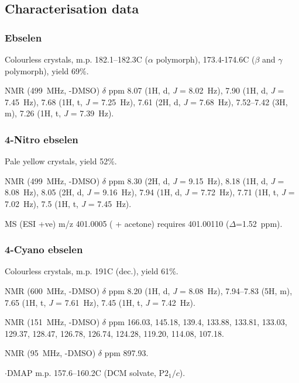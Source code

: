 \begin{refsection}
\subsection{Characterisation data}

\subsubsection{Ebselen }
Colourless crystals, m.p. 182.1--182.3\degree{}C ($\alpha$ polymorph), 173.4-174.6\degree{}C ($\beta$ and $\gamma$ polymorph), yield 69\%.

 NMR (499~MHz, -DMSO) $ \delta $ ppm 8.07 (1H, d, \textit{J} = 8.02~Hz), 7.90 (1H, d, \textit{J} = 7.45~Hz), 7.68 (1H, t, \textit{J} = 7.25~Hz), 7.61 (2H, d, \textit{J} = 7.68~Hz), 7.52--7.42 (3H, m), 7.26 (1H, t, \textit{J} = 7.39~Hz).

\subsubsection{4-Nitro ebselen }
Pale yellow crystals, yield 52\%.

 NMR (499~MHz, -DMSO) $ \delta $ ppm 8.30 (2H, d, \textit{J} = 9.15~Hz), 8.18 (1H, d, \textit{J} = 8.08~Hz), 8.05 (2H, d, \textit{J} = 9.16~Hz), 7.94 (1H, d, \textit{J} = 7.72~Hz), 7.71 (1H, t, \textit{J} = 7.02~Hz), 7.5 (1H, t, \textit{J} = 7.45~Hz).

MS (ESI +ve) m/z 401.0005 ( + acetone)  requires 401.00110 ($ \Delta $=1.52~ppm).

\subsubsection{4-Cyano ebselen }
Colourless crystals, m.p. 191\degree{}C (dec.), yield 61\%.

 NMR (600~MHz, -DMSO) $ \delta $ ppm 8.20 (1H, d, \textit{J} = 8.08~Hz), 7.94--7.83 (5H, m), 7.65 (1H, t, \textit{J} = 7.61~Hz), 7.45 (1H, t, \textit{J} = 7.42~Hz).

 NMR (151~MHz, -DMSO) $ \delta $ ppm 166.03, 145.18, 139.4, 133.88, 133.81, 133.03, 129.37, 128.47, 126.78, 126.74, 124.28, 119.20, 114.08, 107.18.

 NMR (95~MHz, -DMSO) $ \delta $ ppm 897.93.

$ \cdot $DMAP m.p. 157.6--160.2\degree{}C (DCM solvate, P$2_1/c$).


\end{refsection}
